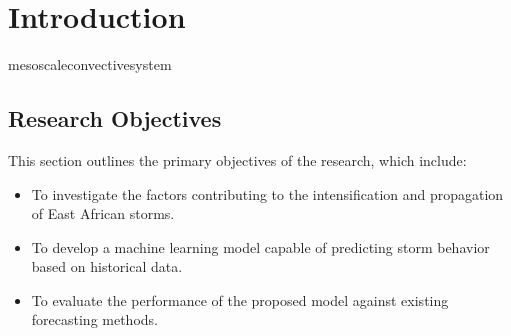 \chapter{Introduction}
\label{ch:intro}

\cite{Gebrechorkos2019}
\Gls{mesoscaleconvectivesystem}

\section{Research Objectives}

This section outlines the primary objectives of the research, which include:
\begin{itemize}
    \item To investigate the factors contributing to the intensification and propagation of East African storms.
    \item To develop a machine learning model capable of predicting storm behavior based on historical data.
    \item To evaluate the performance of the proposed model against existing forecasting methods.
\end{itemize}




